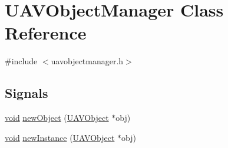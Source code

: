 \hypertarget{class_u_a_v_object_manager}{\section{\-U\-A\-V\-Object\-Manager \-Class \-Reference}
\label{class_u_a_v_object_manager}
}


{\ttfamily \#include $<$uavobjectmanager.\-h$>$}

\subsection*{\-Signals}
\begin{DoxyCompactItemize}
\item 
\hyperlink{group___u_a_v_objects_plugin_ga444cf2ff3f0ecbe028adce838d373f5c}{void} \hyperlink{group___u_a_v_objects_plugin_gaf8c983e30ce7ebac3d4ef742d427b8fe}{new\-Object} (\hyperlink{class_u_a_v_object}{\-U\-A\-V\-Object} $\ast$obj)
\item 
\hyperlink{group___u_a_v_objects_plugin_ga444cf2ff3f0ecbe028adce838d373f5c}{void} \hyperlink{group___u_a_v_objects_plugin_ga7787ebe5de616d95116d5a4b360b6773}{new\-Instance} (\hyperlink{class_u_a_v_object}{\-U\-A\-V\-Object} $\ast$obj)
\end{DoxyCompactItemize}
